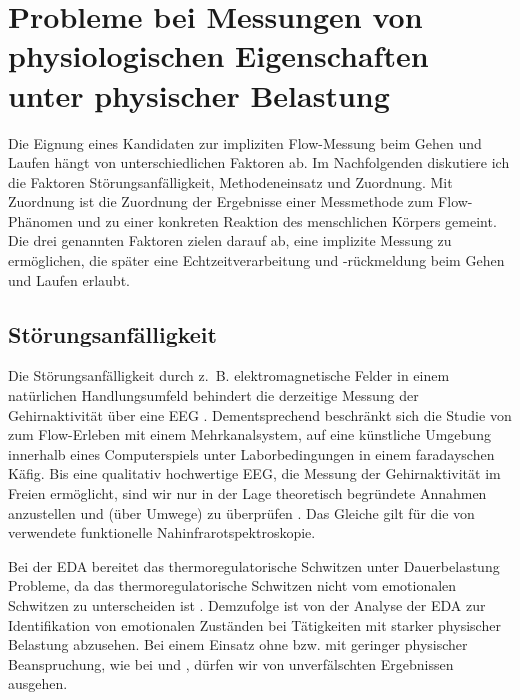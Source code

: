 

\section{Probleme bei Messungen von physiologischen Eigenschaften unter physischer Belastung} 

\label{sec:probleme_bei_messungen}

Die Eignung eines Kandidaten zur impliziten Flow-Messung beim Gehen und Laufen hängt von unterschiedlichen Faktoren ab. Im Nachfolgenden diskutiere ich die Faktoren Störungsanfälligkeit, Methodeneinsatz und Zuordnung. Mit Zuordnung ist die Zuordnung der Ergebnisse einer Messmethode zum Flow-Phänomen und zu einer konkreten Reaktion des menschlichen Körpers gemeint. Die drei genannten Faktoren zielen darauf ab, eine implizite Messung zu ermöglichen, die später eine Echtzeitverarbeitung und -rückmeldung beim Gehen und Laufen erlaubt.

\subsection{Störungsanfälligkeit} 

\label{sub:storungsanfalligkeit}

Die Störungsanfälligkeit durch z.~B. elektromagnetische Felder in einem natürlichen Handlungsumfeld behindert die derzeitige Messung der Gehirnaktivität über eine \ac{EEG} \citep[][S.~56]{Henk2014}. Dementsprechend beschränkt sich die Studie von \citet{Hugentobler2011} zum Flow-Erleben mit einem Mehrkanalsystem, auf eine künstliche Umgebung innerhalb eines Computerspiels unter Laborbedingungen in einem faradayschen Käfig. Bis eine qualitativ hochwertige \ac{EEG}, die Messung der Gehirnaktivität im Freien ermöglicht, sind wir nur in der Lage theoretisch begründete Annahmen anzustellen und (über Umwege) zu überprüfen \citep[][S.~56]{Henk2014}. Das Gleiche gilt für die von \citet{Harmat2015} verwendete funktionelle Nahinfrarotspektroskopie.

Bei der \ac{EDA} bereitet das thermoregulatorische Schwitzen unter Dauerbelastung Probleme, da das thermoregulatorische Schwitzen nicht vom emotionalen Schwitzen zu unterscheiden ist \citep{Baumeister2009}. Demzufolge ist von der Analyse der \ac{EDA} zur Identifikation von emotionalen Zuständen bei Tätigkeiten mit starker physischer Belastung abzusehen. Bei einem Einsatz ohne bzw. mit geringer physischer Beanspruchung, wie bei \citet{Kivikangas2006} und \citet{Nacke2008}, dürfen wir von unverfälschten Ergebnissen ausgehen.

